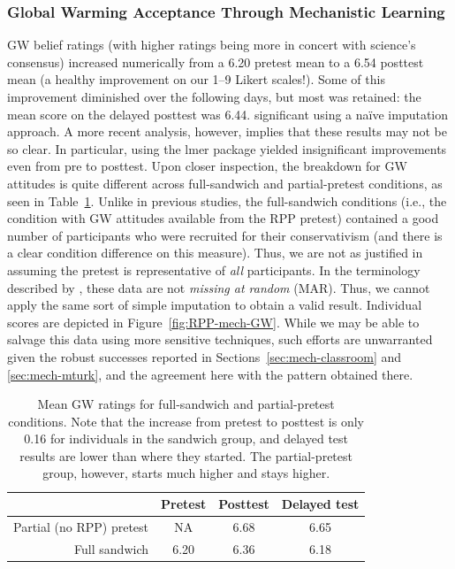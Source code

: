 \subsubsection{Global Warming Acceptance Through Mechanistic Learning}

GW belief ratings (with higher ratings being more in concert with science’s
consensus) increased numerically from a 6.20 pretest mean to a 6.54 posttest
mean
(a healthy improvement on our 1--9 Likert scales!). Some of this improvement
diminished over the following days, but most was retained: the mean score on the
delayed posttest was 6.44.  %
significant using a naïve imputation approach. A more recent analysis, however,
implies that these results may not be so clear.  In particular, using the
\textsf{lmer} package yielded insignificant improvements even from pre to
posttest. Upon closer inspection, the breakdown for GW attitudes is quite
different across full-sandwich and partial-pretest conditions, as seen in
Table~\ref{table:RPP-mech-gw-breakdown}. Unlike in previous studies, the
full-sandwich conditions (i.e., the condition with GW attitudes available from the
RPP pretest) contained a good number of participants who were recruited for
their conservativism (and there is a clear condition difference on this measure).
Thus, we are not as justified in assuming the pretest is representative of
\emph{all} participants. In the terminology described by
\textcite{fox_applied_2008}, these data are not \emph{missing at random} (MAR).
Thus, we cannot apply the same sort of simple imputation to obtain a valid
result.  Individual scores are depicted in Figure~\ref{fig:RPP-mech-GW}. While
we may be able to salvage this data using more sensitive techniques, such
efforts are unwarranted given the robust successes reported in
Sections~\ref{sec:mech-classroom} and \ref{sec:mech-mturk}, and the agreement
here with the pattern obtained there.



\begin{table}[ht]
\centering
\caption{Mean GW ratings for full-sandwich and partial-pretest conditions. Note that the
    increase from pretest to posttest is only 0.16 for individuals in the
    sandwich group, and delayed test results are lower than where they started.
    The partial-pretest group, however, starts much higher and stays higher.}
\label{table:RPP-mech-gw-breakdown}
\begin{tabular}{rccc}
  \toprule
        & Pretest & Posttest & Delayed test \\ 
  \midrule
  Partial (no RPP) pretest & NA & 6.68 & 6.65 \\ 
  Full sandwich & 6.20 & 6.36 & 6.18 \\ 
   \bottomrule
\end{tabular}
\end{table}

